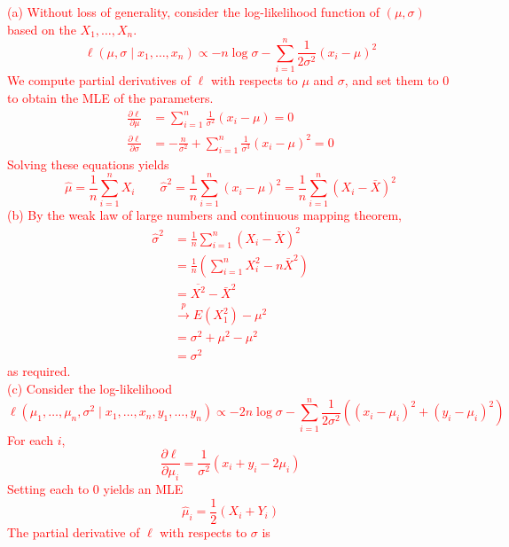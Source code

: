 \documentclass[12pt]{article}
\begin{document}
\begin{enumerate}
\textcolor{red}{(a) Without loss of generality, consider the log-likelihood function of $(\mu, \sigma)$ based on the $X_1,\ldots, X_n$. 
\begin{equation*}
  \ell(\mu, \sigma \mid x_1,\ldots, x_n) \propto -n\log \sigma - \sum_{i=1}^n \frac{1}{2\sigma^2}(x_i - \mu)^2
\end{equation*}
We compute partial derivatives of $\ell$ with respects to $\mu$ and $\sigma$, and set them to 0 to obtain the MLE of the parameters. 
\begin{align*}
  \frac{\partial \ell}{\partial \mu} &= \sum_{i=1}^n \frac{1}{\sigma^2}(x_i - \mu) = 0\\
  \frac{\partial \ell}{\partial \sigma} &= -\frac{n}{\sigma^2} + \sum_{i=1}^n \frac{1}{\sigma^3} (x_i - \mu)^2 = 0 
\end{align*}
Solving these equations yields 
\begin{equation*}
  \hat \mu = \frac1n \sum_{i=1}^n X_i \qquad \hat \sigma^2 = \frac{1}{n}\sum_{i=1}^n (x_i - \mu)^2 = \frac{1}{n}\sum_{i=1}^n (X_i - \bar X)^2
\end{equation*}
(b) By the weak law of large numbers and continuous mapping theorem, 
\begin{align*}
  \hat\sigma^2 &= \frac1n \sum_{i=1}^n (X_i - \bar X)^2\\
  &= \frac{1}{n}\left(\sum_{i=1}^n X_i^2 - n \bar X^2\right)\\
  &= \overline{X^2} - \bar X^2\\
  &\stackrel{p}{\to} E(X_1^2) - \mu^2\\
  &= \sigma^2 + \mu^2 - \mu^2\\
  &= \sigma^2
\end{align*}
as required. \\
(c) Consider the log-likelihood
\begin{equation*}
  \ell(\mu_1,\ldots, \mu_n, \sigma^2 \mid x_1,\ldots, x_n, y_1,\ldots, y_n) \propto -2n\log\sigma - \sum_{i=1}^n \frac{1}{2\sigma^2} ((x_i - \mu_i)^2 + (y_i - \mu_i)^2)
\end{equation*} 
For each $i$, 
\begin{equation*}
  \frac{\partial \ell}{\partial \mu_i} = \frac{1}{\sigma^2}(x_i + y_i - 2\mu_i) 
\end{equation*}
Setting each to 0 yields an MLE 
\begin{equation*}
  \hat\mu_i = \frac{1}{2}(X_i + Y_i)
\end{equation*}
The partial derivative of $\ell$ with respects to $\sigma$ is 
\begin{equation*}

\end{equation*}}
\end{enumerate}
\end{document}
